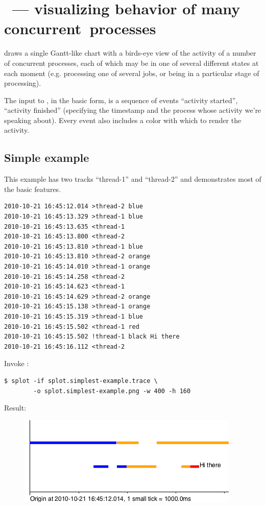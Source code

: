 \documentclass{article}
\begin{document}
\section{\splot{} ~--- visualizing behavior of many \mbox{concurrent processes}}

\splot{} draws a single Gantt-like chart with a birds-eye view of the activity of a number of concurrent processes, each of which may be in one of several different states at each moment (e.g. processing one of several jobs, or being in a particular stage of processing). 

The input to \splot{}, in the basic form, is a sequence of events ``activity started'', ``activity finished'' (specifying the timestamp and the process whose activity we're speaking about). Every event also includes a color with which to render the activity.

\subsection{Simple example}

This example has two tracks ``thread-1'' and ``thread-2'' and demonstrates most of the basic features.

\begin{verbatim}
2010-10-21 16:45:12.014 >thread-2 blue
2010-10-21 16:45:13.329 >thread-1 blue
2010-10-21 16:45:13.635 <thread-1
2010-10-21 16:45:13.800 <thread-2
2010-10-21 16:45:13.810 >thread-1 blue
2010-10-21 16:45:13.810 >thread-2 orange
2010-10-21 16:45:14.010 >thread-1 orange
2010-10-21 16:45:14.258 <thread-2
2010-10-21 16:45:14.623 <thread-1
2010-10-21 16:45:14.629 >thread-2 orange
2010-10-21 16:45:15.138 >thread-1 orange
2010-10-21 16:45:15.319 >thread-1 blue
2010-10-21 16:45:15.502 <thread-1 red
2010-10-21 16:45:15.502 !thread-1 black Hi there
2010-10-21 16:45:16.112 <thread-2
\end{verbatim}

Invoke \splot{}:
\begin{verbatim}
$ splot -if splot.simplest-example.trace \
        -o splot.simplest-example.png -w 400 -h 160
\end{verbatim}

Result:
\begin{figure}[h]
\center
\includegraphics[scale=0.5]{pics/splot/splot-simplest-example.png}
\end{figure}
\end{document}
